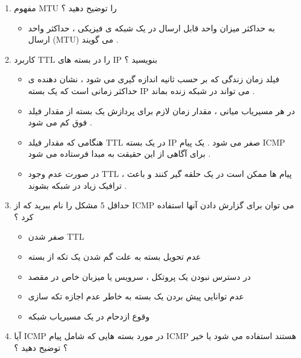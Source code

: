 \documentclass{article}
\begin{document}
\begin{enumerate}
\item مفهوم MTU را توضیح دهید ؟

\begin{tcolorbox}
\begin{itemize}
	\item به حداکثر میزان  واحد قابل ارسال در یک شبکه ی فیزیکی ، حداکثر واحد ارسال 
	(MTU) 
	می گویند .
\end{itemize}
\end{tcolorbox}

\item کاربرد TTL را در بسته های IP بنویسید ؟

\begin{tcolorbox}
\begin{itemize}
	\item فیلد زمان زندگی که بر حسب ثانیه اندازه گیری می شود ، نشان دهنده ی حداکثر زمانی است که یک بسته IP 
	می تواند در شبکه زنده بماند .
	\item در هر مسیریاب میانی ، مقدار زمان لازم برای پردازش یک بسته از مقدار فیلد فوق کم می شود .
	\item 	هنگامی که مقدار فیلد TTL در یک بسته IP صفر می شود . یک پیام ICMP برای آگاهی از این حقیقت به مبدا فرستاده می شود .
	\item در صورت عدم وجود TTL 
	، پیام ها ممکن است در یک حلقه گیر کنند و باعث ترافیک زیاد در شبکه بشوند .
\end{itemize}
\end{tcolorbox}

\newpage

\item حداقل 5 مشکل را نام ببرید که از ICMP می توان برای گزارش دادن آنها استفاده کرد ؟

\begin{tcolorbox}
\begin{itemize}
	\item صفر شدن TTL
	\item عدم تحویل بسته به علت گم شدن یک تکه از بسته
	\item در دسترس نبودن یک پروتکل ، سرویس یا میزبان خاص در مقصد
	\item عدم توانایی پیش بردن یک بسته به خاطر عدم اجازه تکه سازی
	\item وقوع ازدحام در یک مسیریاب شبکه
\end{itemize}
\end{tcolorbox}

\item آیا ICMP در مورد بسته هایی که شامل پیام  ICMP هستند استفاده می شود یا خیر ؟ توضیح دهید ؟


\end{enumerate}
\end{document}
